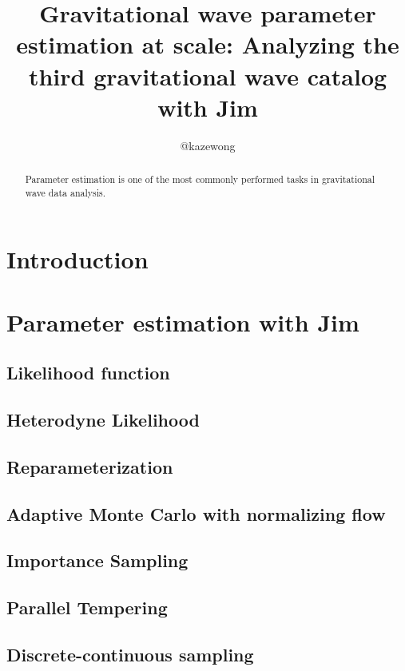 \documentclass[twocolumn]{aastex631}
\begin{document}
\title{Gravitational wave parameter estimation at scale: Analyzing the third gravitational wave catalog with Jim}

\author{@kazewong}

\begin{abstract}
Parameter estimation is one of the most commonly performed tasks in gravitational wave data analysis.

\end{abstract}

\section{Introduction}
\label{sec:intro}

\section{Parameter estimation with Jim}

\subsection{Likelihood function}

\subsection{Heterodyne Likelihood}

\subsection{Reparameterization}

\subsection{Adaptive Monte Carlo with normalizing flow}

\subsection{Importance Sampling}

\subsection{Parallel Tempering}

\subsection{Discrete-continuous sampling}
\end{document}
